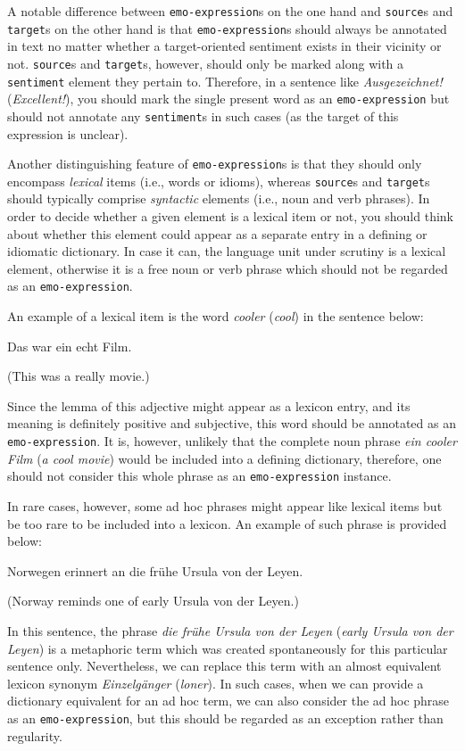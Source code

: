 A notable difference between \texttt{emo-expression}s on the one hand
and \texttt{source}s and \texttt{target}s on the other hand is that
\texttt{emo-ex\-pre\-ssion}s should always be annotated in text no
matter whether a target-oriented sentiment exists in their vicinity or
not. \texttt{source}s and \texttt{target}s, however, should only be
marked along with a \texttt{sentiment} element they pertain to.
Therefore, in a sentence like \emph{Ausgezeichnet!}
(\emph{Excellent!}), you should mark the single present word as an
\texttt{emo-expression} but should not annotate any
\texttt{sentiment}s in such cases (as the target of this expression is
unclear).

Another distinguishing feature of \texttt{emo-expression}s is that
they should only encompass \emph{lexical} items (i.e., words or
idioms), whereas \texttt{source}s and \texttt{target}s should
typically comprise \emph{syntactic} elements (i.e., noun and verb
phrases).  In order to decide whether a given element is a lexical
item or not, you should think about whether this element could appear
as a separate entry in a defining or idiomatic dictionary.  In case it
can, the language unit under scrutiny is a lexical element, otherwise
it is a free noun or verb phrase which should not be regarded as an
\texttt{emo-expression}.

An example of a lexical item is the word \emph{cooler} (\emph{cool})
in the sentence below:
\begin{example}
  Das war ein echt  Film.

  (This was a really  movie.)
\end{example}
\noindent Since the lemma of this adjective might appear as a lexicon
entry, and its meaning is definitely positive and subjective, this
word should be annotated as an \texttt{emo-expression}.  It is,
however, unlikely that the complete noun phrase \emph{ein cooler Film}
(\emph{a cool movie}) would be included into a defining dictionary,
therefore, one should not consider this whole phrase as an
\texttt{emo-expression} instance.

In rare cases, however, some ad hoc phrases might appear like lexical
items but be too rare to be included into a lexicon.  An example of
such phrase is provided below:
\begin{example}
Norwegen erinnert an \textrm{die fr\"uhe Ursula von der Leyen}.

(Norway reminds one of \textrm{early Ursula von der Leyen}.)
\end{example}
\noindent In this sentence, the phrase \emph{die fr\"uhe Ursula von
  der Leyen} (\emph{early Ursula von der Leyen}) is a metaphoric term
which was created spontaneously for this particular sentence only.
Nevertheless, we can replace this term with an almost equivalent
lexicon synonym \emph{Einzelg\"anger} (\emph{loner}).  In such cases,
when we can provide a dictionary equivalent for an ad hoc term, we can
also consider the ad hoc phrase as an \texttt{emo-expression}, but
this should be regarded as an exception rather than regularity.

